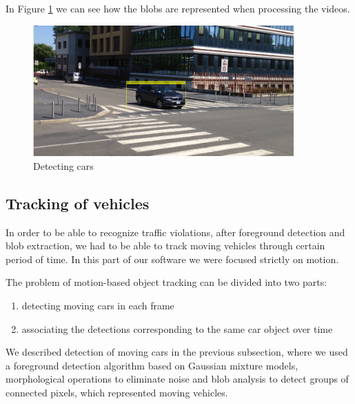 \documentclass[12pt]{article} %
\begin{document}
In Figure \ref{fig:car-detect} we can see how the blobs are represented when processing the videos.
\begin{figure}[ht]
\centering
\includegraphics[width=10cm]{images/tracking.png}
\caption{Detecting cars}
\label{fig:car-detect}
\end{figure}

\subsection{Tracking of vehicles}

In order to be able to recognize traffic violations, after foreground detection and blob extraction, we had to be able to track moving vehicles through certain period of time. In this part of our software we were focused strictly on motion.

The problem of motion-based object tracking can be divided into two parts:

\begin{enumerate}
\item detecting moving cars in each frame
\item associating the detections corresponding to the same car object over time
\end{enumerate}

We described detection of moving cars in the previous subsection, where we used a foreground detection algorithm based on Gaussian mixture models, morphological operations to eliminate noise and blob analysis to detect groups of connected pixels, which represented moving vehicles.
\end{document}
